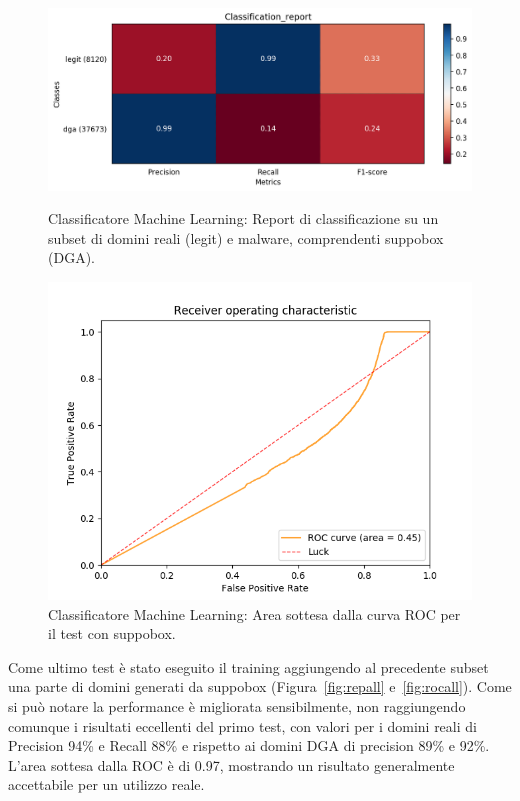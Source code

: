 \begin{figure}[!bp]
    \centering
    \includegraphics[width=\columnwidth]{figures/rndf_tra_nosup_sup/class_rep.png}
    \caption{Classificatore Machine Learning: Report di classificazione su un subset di domini reali (legit) e malware, comprendenti suppobox (DGA).\label{fig:repsup}}

    \centering
    \includegraphics[width=\columnwidth]{figures/rndf_tra_nosup_sup/roc_plot.png}
    \caption{Classificatore Machine Learning: Area sottesa dalla curva ROC per il test con  suppobox.\label{fig:rocsup}}
\end{figure}

Come ultimo test è stato eseguito il training aggiungendo al precedente subset una parte di domini generati da suppobox (Figura~\ref{fig:repall} e~\ref{fig:rocall}). Come si può notare la performance è migliorata sensibilmente, non raggiungendo comunque i risultati eccellenti del primo test, con valori per i domini reali di Precision 94\% e Recall 88\% e rispetto ai domini DGA di precision 89\% e 92\%.
L'area sottesa dalla ROC è di 0.97, mostrando un risultato generalmente accettabile per un utilizzo reale.

